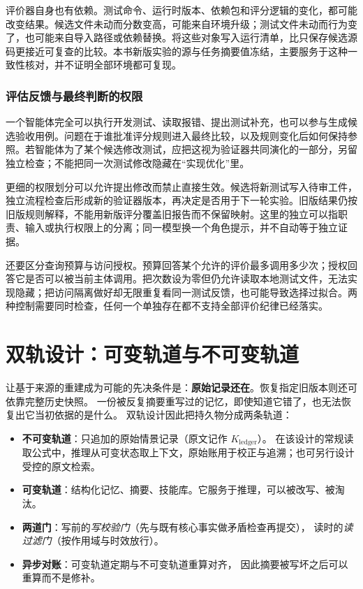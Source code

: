 评价器自身也有依赖。测试命令、运行时版本、依赖包和评分逻辑的变化，都可能改变结果。候选文件未动而分数变高，可能来自环境升级；测试文件未动而行为变了，也可能来自导入路径或依赖替换。将这些对象写入运行清单，比只保存候选源码更接近可复查的比较。本书新版实验的源与任务摘要值冻结，主要服务于这种一致性核对，并不证明全部环境都可复现。

\subsubsection{评估反馈与最终判断的权限}

一个智能体完全可以执行开发测试、读取报错、提出测试补充，也可以参与生成候选验收用例。问题在于谁批准评分规则进入最终比较，以及规则变化后如何保持参照。若智能体为了某个候选修改测试，应把这视为验证器共同演化的一部分，另留独立检查；不能把同一次测试修改隐藏在“实现优化”里。

更细的权限划分可以允许提出修改而禁止直接生效。候选将新测试写入待审工件，独立流程检查后形成新的验证器版本，再决定是否用于下一轮实验。旧版结果仍按旧版规则解释，不能用新版评分覆盖旧报告而不保留映射。这里的独立可以指职责、输入或执行权限上的分离；同一模型换一个角色提示，并不自动等于独立证据。

还要区分查询预算与访问授权。预算回答某个允许的评价最多调用多少次；授权回答它是否可以被当前主体调用。把次数设为零但仍允许读取本地测试文件，无法实现隐藏；把访问隔离做好却无限重复看同一测试反馈，也可能导致选择过拟合。两种控制需要同时检查，任何一个单独存在都不支持全部评价纪律已经落实。

\section{双轨设计：可变轨道与不可变轨道}
\label{sec:ch14-rail}

\begin{sloppypar}
让基于来源的重建成为可能的先决条件是：\textbf{原始记录还在}。恢复指定旧版本则还可依靠完整历史快照。
一份被反复摘要重写过的记忆，即使知道它错了，也无法恢复出它当初依据的是什么。
双轨设计因此把持久物分成两条轨道\cite{ssgm-2603}：
\end{sloppypar}

\begin{itemize}
  \item \textbf{不可变轨道}：只追加的原始情景记录（原文记作 $K_{\text{ledger}}$）。
        在该设计的常规读取公式中，推理从可变状态取上下文，原始账用于校正与追溯；也可另行设计受控的原文检索。
  \item \textbf{可变轨道}：结构化记忆、摘要、技能库。它服务于推理，可以被改写、被淘汰。
  \item \textbf{两道门}：写前的\emph{写校验门}（先与既有核心事实做矛盾检查再提交），
        读时的\emph{读过滤门}（按作用域与时效放行）。
  \item \textbf{异步对账}：可变轨道定期与不可变轨道重算对齐，
        因此摘要被写坏之后可以重算而不是修补。
\end{itemize}

